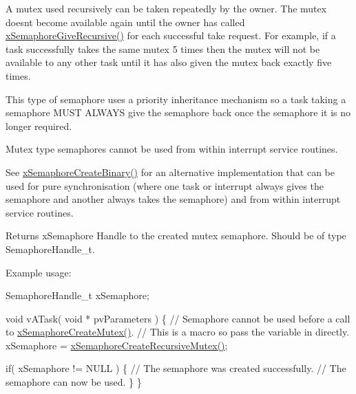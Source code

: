 A mutex used recursively can be \textquotesingle{}taken\textquotesingle{} repeatedly by the owner. The mutex doesn\textquotesingle{}t become available again until the owner has called \hyperlink{vendor_2ceedling_2plugins_2freertos_2src_2freertos_2include_2semphr_8h_a398d66b17856c22dd49d39aaac42f105}{x\+Semaphore\+Give\+Recursive()} for each successful \textquotesingle{}take\textquotesingle{} request. For example, if a task successfully \textquotesingle{}takes\textquotesingle{} the same mutex 5 times then the mutex will not be available to any other task until it has also \textquotesingle{}given\textquotesingle{} the mutex back exactly five times.

This type of semaphore uses a priority inheritance mechanism so a task \textquotesingle{}taking\textquotesingle{} a semaphore M\+U\+ST A\+L\+W\+A\+YS \textquotesingle{}give\textquotesingle{} the semaphore back once the semaphore it is no longer required.

Mutex type semaphores cannot be used from within interrupt service routines.

See \hyperlink{vendor_2ceedling_2plugins_2freertos_2src_2freertos_2include_2semphr_8h_acba963695e4f159d9bfa2394cae5badc}{x\+Semaphore\+Create\+Binary()} for an alternative implementation that can be used for pure synchronisation (where one task or interrupt always \textquotesingle{}gives\textquotesingle{} the semaphore and another always \textquotesingle{}takes\textquotesingle{} the semaphore) and from within interrupt service routines.

\begin{DoxyReturn}{Returns}
x\+Semaphore Handle to the created mutex semaphore. Should be of type Semaphore\+Handle\+\_\+t.
\end{DoxyReturn}
Example usage\+: 
\begin{DoxyPre}
SemaphoreHandle\_t xSemaphore;\end{DoxyPre}



\begin{DoxyPre}void vATask( void * pvParameters )
\{
 // Semaphore cannot be used before a call to \hyperlink{vendor_2ceedling_2plugins_2freertos_2src_2freertos_2include_2semphr_8h_aa6a00aa9b91a9e5b3ebe4ae1c3f115c6}{xSemaphoreCreateMutex()}.
 // This is a macro so pass the variable in directly.
 xSemaphore = \hyperlink{vendor_2ceedling_2plugins_2freertos_2src_2freertos_2include_2semphr_8h_a1bbc843be5a41ea83d2693b2189fc0f8}{xSemaphoreCreateRecursiveMutex()};\end{DoxyPre}



\begin{DoxyPre} if( xSemaphore != NULL )
 \{
     // The semaphore was created successfully.
     // The semaphore can now be used.
 \}
\}
\end{DoxyPre}
 